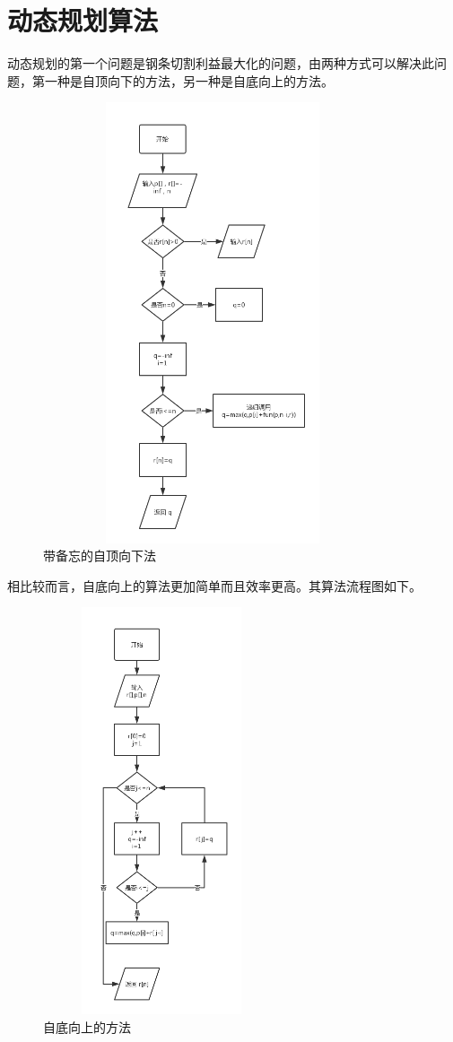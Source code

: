 \documentclass[UTF8]{ctexart}
\begin{document}
	\section{动态规划算法}
	动态规划的第一个问题是钢条切割利益最大化的问题，由两种方式可以解决此问题，第一种是自顶向下的方法，另一种是自底向上的方法。
	\begin{figure}[h]
		\centering
		\includegraphics[width=10cm,height=13cm]{1}
		\caption{带备忘的自顶向下法}
	\end{figure}
	\par
	相比较而言，自底向上的算法更加简单而且效率更高。其算法流程图如下。
	\begin{figure}[h]
		\centering
		\includegraphics[width=7cm,height=12cm]{2}
		\caption{自底向上的方法}
	\end{figure}
\end{document}
